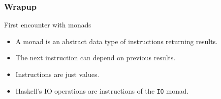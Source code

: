 \documentclass{beamer}
\begin{document}
\begin{frame}
  \frametitle{Wrapup}
  \begin{alertblock}{First encounter with monads}
  \begin{itemize}
  \item A monad is an abstract data type of instructions returning results.
  \item The next instruction can depend on previous results.
  \item Instructions are just values.
  \item Haskell's IO operations are instructions of the \texttt{IO} monad.
  \end{itemize}
  \end{alertblock}
\end{frame}

\end{document}
